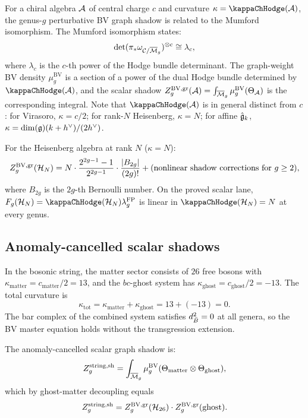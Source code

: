 \begin{construction}
For a chiral algebra $\mathcal{A}$ of central charge $c$ and curvature
$\kappa = \kappaChHodge(\cA)$, the genus-$g$ perturbative BV graph
shadow is related to the Mumford isomorphism. The Mumford isomorphism
states:
\[
\det(\pi_* \omega_{\mathcal{C}/\overline{\mathcal{M}}_g})^{\otimes c}
 \cong
 \lambda_c,
\]
where $\lambda_c$ is the $c$-th power of the Hodge bundle determinant.
The graph-weight BV density $\mu^{\mathrm{BV}}_g$ is a section of a
power of the dual Hodge bundle determined by $\kappaChHodge(\cA)$, and
the scalar shadow
$Z_g^{\mathrm{BV,gr}}(\mathcal{A}) = \int_{\overline{\mathcal{M}}_g}
\mu^{\mathrm{BV}}_g(\Theta_{\mathcal{A}})$ is the corresponding integral.
Note that $\kappaChHodge(\cA)$ is in general distinct from $c$: for Virasoro,
$\kappa = c/2$; for rank-$N$ Heisenberg, $\kappa = N$; for affine
$\hat{\mathfrak{g}}_k$, $\kappa = \dim(\mathfrak{g})(k + h^\vee)/(2h^\vee)$.

For the Heisenberg algebra at rank $N$ ($\kappa = N$):
\[
Z_g^{\mathrm{BV,gr}}(\mathcal{H}_N) = N \cdot
 \frac{2^{2g-1}-1}{2^{2g-1}}\cdot\frac{|B_{2g}|}{(2g)!}
 + \text{(nonlinear shadow corrections for }g \geq 2\text{)},
\]
where $B_{2g}$ is the $2g$-th Bernoulli number. On the proved
scalar lane,
$F_g(\cH_N)=\kappaChHodge(\cH_N)\lambda_g^{\mathrm{FP}}$
is linear in $\kappaChHodge(\cH_N)=N$ at every genus.
\end{construction}

\subsection{Anomaly-cancelled scalar shadows}

\begin{proposition}
In the bosonic string, the matter sector consists of $26$ free
bosons with $\kappa_{\mathrm{matter}} = c_{\mathrm{matter}}/2 = 13$,
and the $bc$-ghost system has $\kappa_{\mathrm{ghost}} = c_{\mathrm{ghost}}/2 = -13$.
The total curvature is
\[
\kappa_{\mathrm{tot}} = \kappa_{\mathrm{matter}} + \kappa_{\mathrm{ghost}}
 = 13 + (-13) = 0.
\]
The bar complex of the combined system satisfies $d_{\bar{B}}^2 = 0$ at
all genera, so the BV master equation holds without the transgression
extension.

The anomaly-cancelled scalar graph shadow is:
\[
Z_g^{\mathrm{string,sh}}
 = \int_{\overline{\mathcal{M}}_g}
 \mu^{\mathrm{BV}}_g(\Theta_{\mathrm{matter}} \otimes
 \Theta_{\mathrm{ghost}}),
\]
which by ghost-matter decoupling equals
\[
Z_g^{\mathrm{string,sh}}
 = Z_g^{\mathrm{BV,gr}}(\mathcal{H}_{26})
 \cdot Z_g^{\mathrm{BV,gr}}(\mathrm{ghost}).
\]
\end{proposition}

